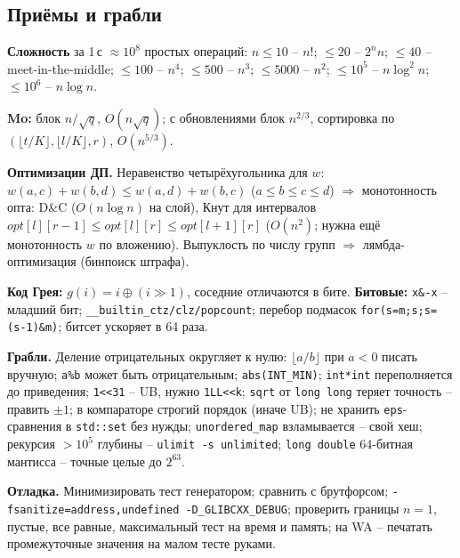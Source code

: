 \subsection{Приёмы и грабли}
\textbf{Сложность} за 1\,с $\approx10^8$ простых операций: $n\le10$ -- $n!$; $\le20$ -- $2^nn$; $\le40$ -- meet-in-the-middle; $\le100$ -- $n^4$; $\le500$ -- $n^3$; $\le5000$ -- $n^2$; $\le10^5$ -- $n\log^2n$; $\le10^6$ -- $n\log n$.
\par \textbf{Mo:} блок $n/\sqrt q$, $O(n\sqrt q)$; с обновлениями блок $n^{2/3}$, сортировка по $(\lfloor t/K\rfloor,\lfloor l/K\rfloor,r)$, $O(n^{5/3})$.
\par \textbf{Оптимизации ДП.} Неравенство четырёхугольника для $w$: $w(a,c)+w(b,d)\le w(a,d)+w(b,c)$ ($a\le b\le c\le d$) $\Rightarrow$ монотонность опта: D\&C ($O(n\log n)$ на слой), Кнут для интервалов $opt[l][r{-}1]\le opt[l][r]\le opt[l{+}1][r]$ ($O(n^2)$; нужна ещё монотонность $w$ по вложению). Выпуклость по числу групп $\Rightarrow$ лямбда-оптимизация (бинпоиск штрафа).
\par \textbf{Код Грея:} $g(i)=i\oplus(i\gg1)$, соседние отличаются в бите. \textbf{Битовые:} \texttt{x\&-x} -- младший бит; \texttt{\_\_builtin\_ctz/clz/popcount}; перебор подмасок \texttt{for(s=m;s;s=(s-1)\&m)}; битсет ускоряет в 64 раза.
\par \textbf{Грабли.} Деление отрицательных округляет к нулю: $\lfloor a/b\rfloor$ при $a<0$ писать вручную; \texttt{a\%b} может быть отрицательным; \texttt{abs(INT\_MIN)}; \texttt{int*int} переполняется до приведения; \texttt{1<<31} -- UB, нужно \texttt{1LL<<k}; \texttt{sqrt} от \texttt{long long} теряет точность -- править $\pm1$; в компараторе строгий порядок (иначе UB); не хранить \texttt{eps}-сравнения в \texttt{std::set} без нужды; \texttt{unordered\_map} взламывается -- свой хеш; рекурсия $>10^5$ глубины -- \texttt{ulimit -s unlimited}; \texttt{long double} 64-битная мантисса -- точные целые до $2^{63}$.
\par \textbf{Отладка.} Минимизировать тест генератором; сравнить с брутфорсом; \texttt{-fsanitize=address,undefined -D\_GLIBCXX\_DEBUG}; проверить границы $n{=}1$, пустые, все равные, максимальный тест на время и память; на WA -- печатать промежуточные значения на малом тесте руками.
